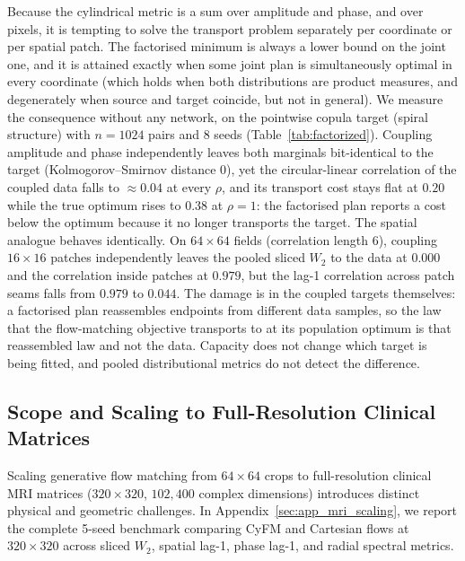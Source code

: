 Because the cylindrical metric is a sum over amplitude and phase, and over pixels, it is tempting to solve the transport problem separately per coordinate or per spatial patch. The factorised minimum is always a lower bound on the joint one, and it is attained exactly when some joint plan is simultaneously optimal in every coordinate (which holds when both distributions are product measures, and degenerately when source and target coincide, but not in general). We measure the consequence without any network, on the pointwise copula target (spiral structure) with $n = 1024$ pairs and 8 seeds (Table~\ref{tab:factorized}). Coupling amplitude and phase independently leaves both marginals bit-identical to the target (Kolmogorov--Smirnov distance $0$), yet the circular-linear correlation of the coupled data falls to $\approx 0.04$ at every $\rho$, and its transport cost stays flat at $0.20$ while the true optimum rises to $0.38$ at $\rho = 1$: the factorised plan reports a cost below the optimum because it no longer transports the target. The spatial analogue behaves identically. On $64\times64$ fields (correlation length 6), coupling $16\times16$ patches independently leaves the pooled sliced $W_2$ to the data at $0.000$ and the correlation inside patches at $0.979$, but the lag-1 correlation across patch seams falls from $0.979$ to $0.044$. The damage is in the coupled targets themselves: a factorised plan reassembles endpoints from different data samples, so the law that the flow-matching objective transports to at its population optimum is that reassembled law and not the data. Capacity does not change which target is being fitted, and pooled distributional metrics do not detect the difference.

\subsection{Scope and Scaling to Full-Resolution Clinical Matrices}
\label{sec:exp_scaling_320}

Scaling generative flow matching from $64\times64$ crops to full-resolution clinical MRI matrices ($320\times320$, $102{,}400$ complex dimensions) introduces distinct physical and geometric challenges. In Appendix~\ref{sec:app_mri_scaling}, we report the complete 5-seed benchmark comparing CyFM and Cartesian flows at $320\times320$ across sliced $W_2$, spatial lag-1, phase lag-1, and radial spectral metrics.

